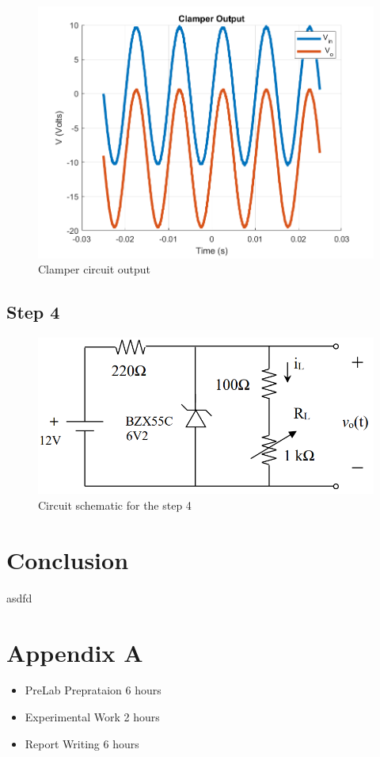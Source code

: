 \documentclass[letterpaper,12pt]{article}
\begin{document}
\begin{figure}[H]
    \centering
    \includegraphics[width=1\textwidth]{3.png}
    \caption{Clamper circuit output }
\end{figure} 
    

\subsection{Step 4}

\begin{figure}[H]
    \centering
    \includegraphics[width=1\textwidth]{4_1.png}
    \caption{Circuit schematic for the step 4}
\end{figure} 
    
    
\section{Conclusion}
asdfd
\section*{Appendix A}
\begin{itemize}
    \item PreLab Preprataion 6 hours
    \item Experimental Work 2  hours
    \item Report Writing 6 hours
\end{itemize}
\end{document}
